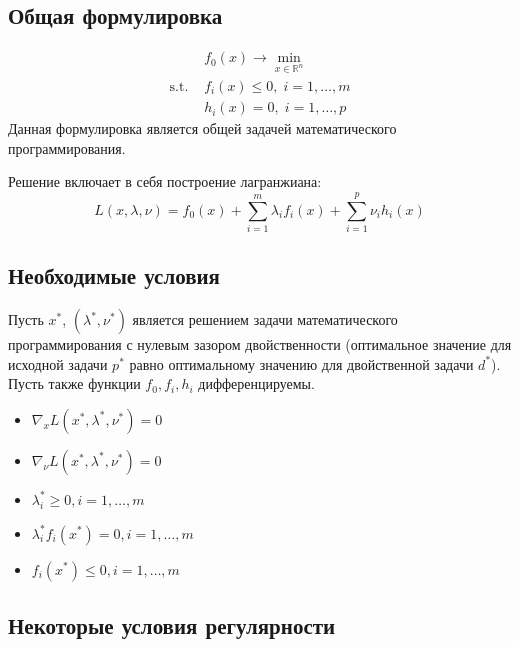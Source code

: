 \documentclass[
  russian,
  letterpaper,
  DIV=11,
  numbers=noendperiod]{scrartcl}
\providecommand{\tightlist}{%
  \setlength{\itemsep}{0pt}\setlength{\parskip}{0pt}}
\begin{document}
\subsection{Общая
формулировка}\label{ux43eux431ux449ux430ux44f-ux444ux43eux440ux43cux443ux43bux438ux440ux43eux432ux43aux430}

\[
\begin{split}
& f_0(x) \to \min\limits_{x \in \mathbb{R}^n}\\
\text{s.t. } & f_i(x) \leq 0, \; i = 1,\ldots,m\\
& h_i(x) = 0, \; i = 1,\ldots, p
\end{split}
\] Данная формулировка является общей задачей математического
программирования.

Решение включает в себя построение лагранжиана: \[
L(x, \lambda, \nu) = f_0(x) + \sum\limits_{i=1}^m \lambda_i f_i(x) + \sum\limits_{i=1}^p\nu_i h_i(x)
\]

\subsection{Необходимые
условия}\label{ux43dux435ux43eux431ux445ux43eux434ux438ux43cux44bux435-ux443ux441ux43bux43eux432ux438ux44f-1}

Пусть \(x^*\), \((\lambda^*, \nu^*)\) является решением задачи
математического программирования с нулевым зазором двойственности
(оптимальное значение для исходной задачи \(p^*\) равно оптимальному
значению для двойственной задачи \(d^*\)). Пусть также функции
\(f_0, f_i, h_i\) дифференцируемы.

\begin{itemize}
\tightlist
\item
  \(\nabla_x L(x^*, \lambda^*, \nu^*) = 0\)
\item
  \(\nabla_\nu L(x^*, \lambda^*, \nu^*) = 0\)
\item
  \(\lambda^*_i \geq 0, i = 1,\ldots,m\)
\item
  \(\lambda^*_i f_i(x^*) = 0, i = 1,\ldots,m\)
\item
  \(f_i(x^*) \leq 0, i = 1,\ldots,m\)
\end{itemize}

\subsection{Некоторые условия
регулярности}\label{ux43dux435ux43aux43eux442ux43eux440ux44bux435-ux443ux441ux43bux43eux432ux438ux44f-ux440ux435ux433ux443ux43bux44fux440ux43dux43eux441ux442ux438}
\end{document}
